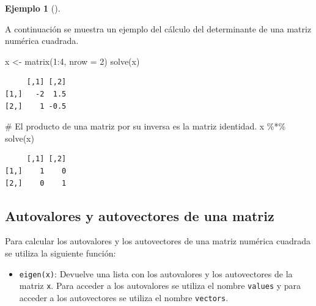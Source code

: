 \documentclass[
  a4paper,
]{scrreport}
\newenvironment{Shaded}{\begin{snugshade}}{\end{snugshade}}
\newcommand{\AttributeTok}[1]{\textcolor[rgb]{0.40,0.45,0.13}{#1}}
\newcommand{\CommentTok}[1]{\textcolor[rgb]{0.37,0.37,0.37}{#1}}
\newcommand{\DecValTok}[1]{\textcolor[rgb]{0.68,0.00,0.00}{#1}}
\newcommand{\FunctionTok}[1]{\textcolor[rgb]{0.28,0.35,0.67}{#1}}
\newcommand{\NormalTok}[1]{\textcolor[rgb]{0.00,0.23,0.31}{#1}}
\newcommand{\OtherTok}[1]{\textcolor[rgb]{0.00,0.23,0.31}{#1}}
\newcommand{\SpecialCharTok}[1]{\textcolor[rgb]{0.37,0.37,0.37}{#1}}
\providecommand{\tightlist}{%
  \setlength{\itemsep}{0pt}\setlength{\parskip}{0pt}}\usepackage{longtable,booktabs,array}
\theoremstyle{definition}
\theoremstyle{definition}
\newtheorem{example}{Ejemplo}[chapter]
\theoremstyle{remark}
\begin{document}
\leavevmode{}%
\begin{example}[]\label{exm-inversa-matriz}

A continuación se muestra un ejemplo del cálculo del determinante de una
matriz numérica cuadrada.

\begin{Shaded}
\begin{Highlighting}[]
\NormalTok{x }\OtherTok{\textless{}{-}} \FunctionTok{matrix}\NormalTok{(}\DecValTok{1}\SpecialCharTok{:}\DecValTok{4}\NormalTok{, }\AttributeTok{nrow =} \DecValTok{2}\NormalTok{)}
\FunctionTok{solve}\NormalTok{(x)}
\end{Highlighting}
\end{Shaded}

\begin{verbatim}
     [,1] [,2]
[1,]   -2  1.5
[2,]    1 -0.5
\end{verbatim}

\begin{Shaded}
\begin{Highlighting}[]
\CommentTok{\# El producto de una matriz por su inversa es la matriz identidad.}
\NormalTok{x }\SpecialCharTok{\%*\%} \FunctionTok{solve}\NormalTok{(x)}
\end{Highlighting}
\end{Shaded}

\begin{verbatim}
     [,1] [,2]
[1,]    1    0
[2,]    0    1
\end{verbatim}

\end{example}

\hypertarget{autovalores-y-autovectores-de-una-matriz}{%
\subsection{Autovalores y autovectores de una
matriz}\label{autovalores-y-autovectores-de-una-matriz}}

Para calcular los autovalores y los autovectores de una matriz numérica
cuadrada se utiliza la siguiente función:

\begin{itemize}
\tightlist
\item
  \texttt{eigen(x)}: Devuelve una lista con los autovalores y los
  autovectores de la matriz \texttt{x}. Para acceder a los autovalores
  se utiliza el nombre \texttt{values} y para acceder a los autovectores
  se utiliza el nombre \texttt{vectors}.
\end{itemize}
\end{document}
